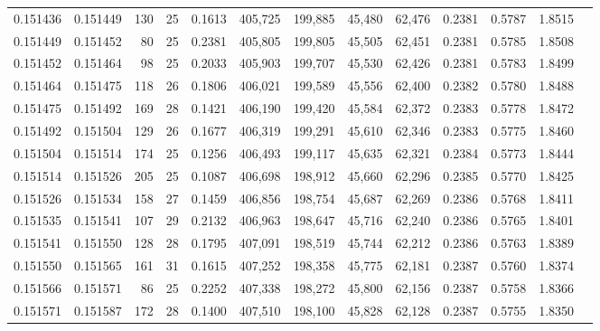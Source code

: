 \begin{tabular}{rrrrrrrrrrrrr}
0.151436 & 0.151449 & 130 &  25 &                                     0.1613 & 405,725 & 199,885 &  45,480 &  62,476 & 0.2381 & 0.5787 & 1.8515 \\
0.151449 & 0.151452 &  80 &  25 &                                     0.2381 & 405,805 & 199,805 &  45,505 &  62,451 & 0.2381 & 0.5785 & 1.8508 \\
0.151452 & 0.151464 &  98 &  25 &                                     0.2033 & 405,903 & 199,707 &  45,530 &  62,426 & 0.2381 & 0.5783 & 1.8499 \\
0.151464 & 0.151475 & 118 &  26 &                                     0.1806 & 406,021 & 199,589 &  45,556 &  62,400 & 0.2382 & 0.5780 & 1.8488 \\
0.151475 & 0.151492 & 169 &  28 &                                     0.1421 & 406,190 & 199,420 &  45,584 &  62,372 & 0.2383 & 0.5778 & 1.8472 \\
0.151492 & 0.151504 & 129 &  26 &                                     0.1677 & 406,319 & 199,291 &  45,610 &  62,346 & 0.2383 & 0.5775 & 1.8460 \\
0.151504 & 0.151514 & 174 &  25 &                                     0.1256 & 406,493 & 199,117 &  45,635 &  62,321 & 0.2384 & 0.5773 & 1.8444 \\
0.151514 & 0.151526 & 205 &  25 &                                     0.1087 & 406,698 & 198,912 &  45,660 &  62,296 & 0.2385 & 0.5770 & 1.8425 \\
0.151526 & 0.151534 & 158 &  27 &                                     0.1459 & 406,856 & 198,754 &  45,687 &  62,269 & 0.2386 & 0.5768 & 1.8411 \\
0.151535 & 0.151541 & 107 &  29 &                                     0.2132 & 406,963 & 198,647 &  45,716 &  62,240 & 0.2386 & 0.5765 & 1.8401 \\
0.151541 & 0.151550 & 128 &  28 &                                     0.1795 & 407,091 & 198,519 &  45,744 &  62,212 & 0.2386 & 0.5763 & 1.8389 \\
0.151550 & 0.151565 & 161 &  31 &                                     0.1615 & 407,252 & 198,358 &  45,775 &  62,181 & 0.2387 & 0.5760 & 1.8374 \\
0.151566 & 0.151571 &  86 &  25 &                                     0.2252 & 407,338 & 198,272 &  45,800 &  62,156 & 0.2387 & 0.5758 & 1.8366 \\
0.151571 & 0.151587 & 172 &  28 &                                     0.1400 & 407,510 & 198,100 &  45,828 &  62,128 & 0.2387 & 0.5755 & 1.8350 \\

\end{tabular}
